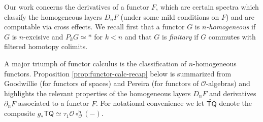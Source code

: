 \documentclass[11pt]{amsart}
\theoremstyle{definition}
\theoremstyle{remark}
\newcommand{\TQ}{\mathsf{TQ}}
\newcommand{\pt}{*}
\newcommand{\Cal}[1]{\mathcal{#1}}
\begin{document}
Our work concerns the derivatives of a functor $F$, which are certain spectra which classify the homogeneous layers $D_nF$ (under some mild conditions on $F$) and are computable via cross effects. We recall first that a functor $G$ is \textit{$n$-homogeneous} if $G$ is $n$-excisive and $P_k G\simeq \pt$ for $k<n$ and that $G$ is \textit{finitary} if $G$ commutes with filtered homotopy colimits. 

A major triumph of functor calculus is the classification of $n$-homogeneous functors. Proposition \ref{prop:functor-calc-recap} below is summarized from Goodwillie \cite{Goo-Calc3} (for functors of spaces) and Pereira \cite{Per-thesis} (for functors of $\Cal{O}$-algebras) and highlights the relevant properties of the homogeneous layers $D_nF$ and derivatives $\partial_n F$ associated to a functor $F$. For notational convenience we let $\widetilde{\TQ}$ denote the composite $g_* \TQ \simeq \tau_1\Cal{O} \circ^{\mathsf{h}}_{\Cal{O}}(-)$.
\end{document}
